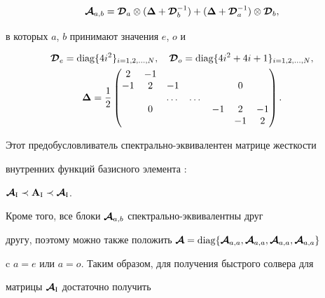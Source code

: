 \begin{equation*}




\bi{\cal A}_{a,b}=\bi{\cal


D}_a\otimes(\bi\Delta+\bi{\cal D}_b^{-1}) +


(\bi\Delta+\bi{\cal D}_a^{-1})\otimes\bi{\cal D}_b,


\end{equation*}


в которых $a$, $b$ принимают значения $e$, $o$ и


\begin{gather*}


\bi{\cal D}_e=\diag\{4i^2\}_{i=1,2,\dotsc,N},\quad \bi{\cal


D}_o=\diag\{4i^2+4i+1\}_{i=1,2,\dotsc,N}, \\


%


\bi\Delta=\frac12


\begin{pmatrix}


2 & -1 & & & & & \\


-1 & 2 & -1& & & 0 & \\


& & \dotsc & \dotsc & & & \\


& 0 & & & -1 & 2 &-1 \\


& & & & & -1 &2 


\end{pmatrix}.


\end{gather*}


Этот предобусловливатель спектрально-эквивалентен матрице жесткости 


внутренних функций базисного элемента \cite{KJ1997}: 


${\boldsymbol{\cal {A}}}_{\mathrm{I}}\prec {\bold A}_{\mathrm{I}} \prec {\boldsymbol{\cal {A}}}_{\mathrm{I}}$.


Кроме того, все блоки $\boldsymbol {\cal A}_{a,b}$ спектрально-эквивалентны друг


другу, поэтому можно также положить $\bi{\cal A}=\diag\{\bi{\cal


A}_{a,a},\bi{\cal A}_{a,a}, \bi{\cal A}_{a,a}, \bi{\cal A}_{a,a}\}$


c $a=e$ или $a=o$. Таким образом, для получения быстрого солвера для 


матрицы $\boldsymbol {\cal A}_{\mathrm{I}}$ достаточно получить


